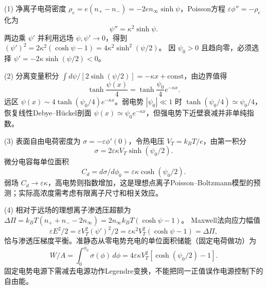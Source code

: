 (1) 净离子电荷密度 \(\rho_e=e(n_+-n_-)=-2en_\infty\sinh\psi\)，Poisson方程 \(\varepsilon\phi''=-\rho_e\) 化为
\[
\boxed{\psi''=\kappa^2\sinh\psi}.
\]
两边乘 \(\psi'\) 并利用远场 \(\psi,\psi'\to0\)，得到
\((\psi')^2=2\kappa^2(\cosh\psi-1)=4\kappa^2\sinh^2(\psi/2)\)。
因 \(\psi_0>0\) 且趋向零，必须选择 \(\psi'=-2\kappa\sinh(\psi/2)<0\)。

(2) 分离变量积分 \(\int d\psi/[2\sinh(\psi/2)]=-\kappa x+\mathrm{const}\)，由边界值得
\[
\boxed{\tanh\frac{\psi(x)}4=\tanh\frac{\psi_0}4e^{-\kappa x}}.
\]
远区 \(\psi(x)\sim4\tanh(\psi_0/4)e^{-\kappa x}\)。弱电势 \(|\psi_0|\ll1\) 时 \(\tanh(\psi_0/4)\simeq\psi_0/4\)，恢复线性Debye–Hückel剖面 \(\psi(x)\simeq\psi_0e^{-\kappa x}\)，但强电势下近壁衰减并非单纯指数。

(3) 表面自由电荷密度为 \(\sigma=-\varepsilon\phi'(0)\)，令热电压 \(V_T=k_BT/e\)，由第一积分
\[
\boxed{\sigma=2\varepsilon\kappa V_T\sinh(\psi_0/2)}.
\]
微分电容每单位面积
\[
\boxed{C_d=d\sigma/d\phi_0=\varepsilon\kappa\cosh(\psi_0/2)}.
\]
弱场 \(C_d\to\varepsilon\kappa\)，高电势则指数增加，这是理想点离子Poisson–Boltzmann模型的预测；实际高浓度需考虑有限离子尺寸和相关效应。

(4) 相对于远场的理想离子渗透压超额为
\(\Delta\Pi=k_BT(n_++n_--2n_\infty)=2n_\infty k_BT(\cosh\psi-1)\)。
Maxwell法向应力幅值
\[
\varepsilon E^2/2=\varepsilon V_T^2(\psi')^2/2
=\varepsilon\kappa^2V_T^2(\cosh\psi-1)=\Delta\Pi,
\]
恰与渗透压梯度平衡。准静态从零电势充电的单位面积储能（固定电荷做功）为
\[
\boxed{W/A=\int_0^{\phi_0}\sigma(\phi)\,d\phi
=4\varepsilon\kappa V_T^2[\cosh(\psi_0/2)-1]}.
\]
固定电势电源下需减去电源功作Legendre变换，不能把同一正值误作电源控制下的自由能。
